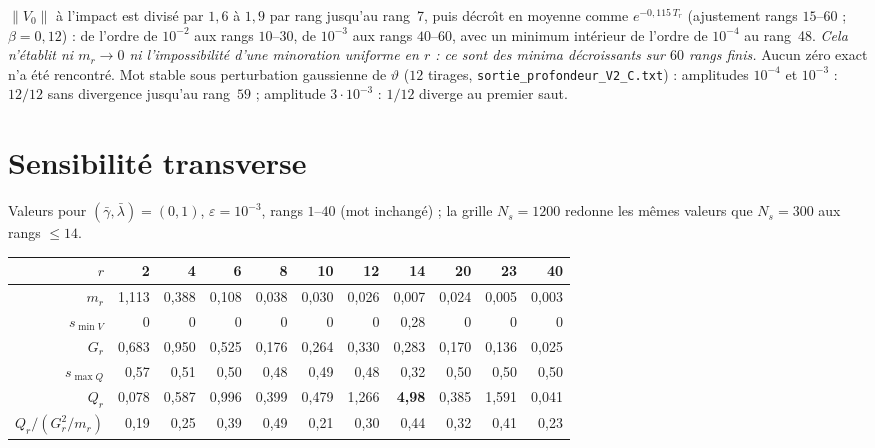 \documentclass[11pt,a4paper]{article}
\theoremstyle{remark}
\newcommand{\norm}[1]{\lVert #1\rVert}
\newcommand{\vth}{\vartheta}
\begin{document}
$\norm{V_0}$ \`a l'impact est divis\'e par $1{,}6$ \`a $1{,}9$ par rang jusqu'au rang~7, puis d\'ecro\^{\i}t en moyenne comme $e^{-0{,}115\,T_r}$ (ajustement rangs $15$--$60$ ; $\beta=0{,}12$) : de l'ordre de $10^{-2}$ aux rangs $10$--$30$, de $10^{-3}$ aux rangs $40$--$60$, avec un minimum int\'erieur de l'ordre de $10^{-4}$ au rang~48. \emph{Cela n'\'etablit ni $m_r\to0$ ni l'impossibilit\'e d'une minoration uniforme en $r$ : ce sont des minima d\'ecroissants sur $60$ rangs finis.} Aucun z\'ero exact n'a \'et\'e rencontr\'e. Mot stable sous perturbation gaussienne de $\vth$ ($12$ tirages, \texttt{sortie\_profondeur\_V2\_C.txt}) : amplitudes $10^{-4}$ et $10^{-3}$ : $12/12$ sans divergence jusqu'au rang~$59$ ; amplitude $3\cdot10^{-3}$ : $1/12$ diverge au premier saut.

\section{Sensibilit\'e transverse}\label{sec:Q}
Valeurs pour $(\bar\gamma,\bar\lambda)=(0,1)$, $\varepsilon=10^{-3}$, rangs $1$--$40$ (mot inchang\'e) ; la grille $N_s=1200$ redonne les m\^emes valeurs que $N_s=300$ aux rangs $\le14$.
\begin{center}\small
\begin{tabular}{r|rrrrrrrrrr}
\toprule
$r$ & 2 & 4 & 6 & 8 & 10 & 12 & 14 & 20 & 23 & 40\\
\midrule
$m_r$ & 1,113 & 0,388 & 0,108 & 0,038 & 0,030 & 0,026 & 0,007 & 0,024 & 0,005 & 0,003\\
$s_{\min V}$ & 0 & 0 & 0 & 0 & 0 & 0 & 0,28 & 0 & 0 & 0\\
$G_r$ & 0,683 & 0,950 & 0,525 & 0,176 & 0,264 & 0,330 & 0,283 & 0,170 & 0,136 & 0,025\\
$s_{\max Q}$ & 0,57 & 0,51 & 0,50 & 0,48 & 0,49 & 0,48 & 0,32 & 0,50 & 0,50 & 0,50\\
$Q_r$ & 0,078 & 0,587 & 0,996 & 0,399 & 0,479 & 1,266 & \textbf{4,98} & 0,385 & 1,591 & 0,041\\
$Q_r/(G_r^2/m_r)$ & 0,19 & 0,25 & 0,39 & 0,49 & 0,21 & 0,30 & 0,44 & 0,32 & 0,41 & 0,23\\
\bottomrule
\end{tabular}
\end{center}
\end{document}
